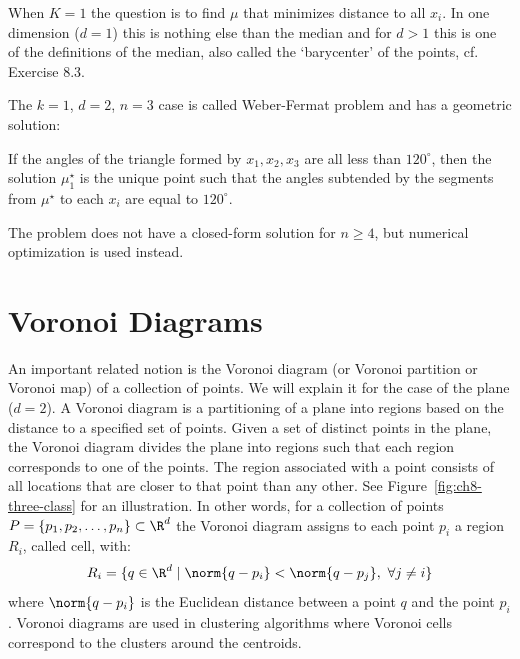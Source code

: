 \begin{remark}
When $K = 1$ the question is to find $\mu$ that minimizes distance to all
$x_i$. In one dimension ($d = 1$) this is nothing else than the median and for
$d > 1$ this is one of the definitions of the median, also called the
`barycenter' of the points, cf. Exercise 8.3.
\end{remark}

\begin{advancedtopics}
The $k=1$, $d=2$, $n=3$ case is called Weber-Fermat problem and has a
geometric solution:

\begin{lemma}
If the angles of the triangle formed by $x_1, x_2, x_3$ are all less than
$120^\circ$, then the solution $\mu_1^\star$ is the unique point such that
the angles subtended by the segments from $\mu^\star$ to each $x_i$ are equal
to $120^\circ$.
\end{lemma}

The problem does not have a closed-form solution for $n \ge 4$, but numerical
optimization is used instead.
\end{advancedtopics}

\section{Voronoi Diagrams}

An important related notion is the Voronoi diagram (or Voronoi partition or
Voronoi map) of a collection of points. We will explain it for the case of
the plane ($d = 2$). A Voronoi diagram is a partitioning of a plane into
regions based on the distance to a specified set of points. Given a set of
distinct points in the plane, the Voronoi diagram divides the plane into
regions such that each region corresponds to one of the points. The region
associated with a point consists of all locations that are closer to that
point than any other. See Figure~\ref{fig:ch8-three-class} for an illustration.
In other words, for a collection of points $P = \{p_1, p_2, \ldots, p_n\}
\subset \R^d$ the Voronoi diagram assigns to each point $p_i$ a region $R_i$,
called cell, with:
\begin{equation}\label{eq:ch8-voronoi}
R_i = \{q \in \R^d \mid \norm{q - p_i} < \norm{q - p_j},\ \forall j \neq i\}
\end{equation}
where $\norm{q - p_i}$ is the Euclidean distance between a point $q$ and the
point $p_i$. Voronoi diagrams are used in clustering algorithms where Voronoi
cells correspond to the clusters around the centroids.


